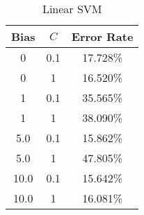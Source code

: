 \begin{center}
\begin{longtable}{|c|c|c|}
\caption{Linear SVM}\label{tab:svm_linear_acctable}\\
\hline
Bias & $C$ & Error Rate \\
\hline
0 & 0.1 & 17.728\% \\
\hline
0 & 1 & 16.520\% \\
\hline
1 & 0.1 & 35.565\% \\
\hline
1 & 1 & 38.090\% \\
\hline
5.0 & 0.1 & 15.862\% \\
\hline
5.0 & 1 & 47.805\% \\
\hline
10.0 & 0.1 & 15.642\% \\
\hline
10.0 & 1 & 16.081\% \\
\hline
\hline
\end{longtable}
\end{center}
